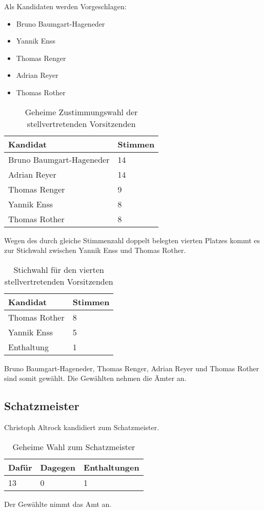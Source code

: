 \documentclass[a4paper]{scrartcl}
\begin{document}
Als Kandidaten werden Vorgeschlagen:
\begin{itemize}
\item Bruno Baumgart-Hageneder
\item Yannik Enss
\item Thomas Renger
\item Adrian Reyer
\item Thomas Rother
\end{itemize}

\begin{table}[H]
\begin{tabularx}{\textwidth}{XX}
Kandidat & Stimmen \\
\toprule
Bruno Baumgart-Hageneder  & 14 \\
Adrian Reyer & 14 \\
Thomas Renger & 9 \\
Yannik Enss  & 8 \\
Thomas Rother & 8 \\
\end{tabularx}
\caption{Geheime Zustimmungswahl der stellvertretenden Vorsitzenden}
\end{table}
Wegen des durch gleiche Stimmenzahl doppelt belegten vierten Platzes kommt es zur Stichwahl zwischen Yannik Enss und Thomas Rother.
\begin{table}[H]
\begin{tabularx}{\textwidth}{XX}
Kandidat & Stimmen \\
\toprule
Thomas Rother & 8 \\
Yannik Enss & 5 \\
\toprule
Enthaltung & 1 \\
\end{tabularx}
\caption{Stichwahl für den vierten stellvertretenden Vorsitzenden}
\end{table}
Bruno Baumgart-Hageneder, Thomas Renger, Adrian Reyer und Thomas Rother sind somit gewählt. Die Gewählten nehmen die Ämter an.
\subsection{Schatzmeister}
Christoph Altrock kandidiert zum Schatzmeister.
\begin{table}[H]
\begin{tabularx}{\textwidth}{XXX}
Dafür & Dagegen & Enthaltungen\\
\toprule
13 & 0 & 1 \\
\end{tabularx}
\caption{Geheime Wahl zum Schatzmeister}
\end{table}
Der Gewählte nimmt das Amt an.
\end{document}
